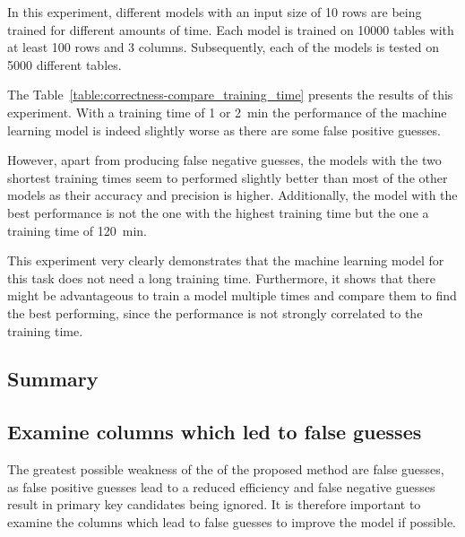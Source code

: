 In this experiment, different models with an input size of \num{10} rows are being trained for different amounts of time. Each model is trained on \num{10000} tables with at least \num{100} rows and \num{3} columns. Subsequently, each of the models is tested on \num{5000} different tables.

The Table~\ref{table:correctness-compare_training_time} presents the results of this experiment. With a training time of \num{1} or \SI{2}{\minute} the performance of the machine learning model is indeed slightly worse as there are some false positive guesses. %

However, apart from producing false negative guesses, the models with the two shortest training times seem to performed slightly better than most of the other models as their accuracy and precision is higher. Additionally, the model with the best performance is not the one with the highest training time but the one a training time of \SI{120}{\minute}. %

This experiment very clearly demonstrates that the machine learning model for this task does not need a long training time. Furthermore, it shows that there might be advantageous to train a model multiple times and compare them to find the best performing, since the performance is not strongly correlated to the training time.






\subsection{Summary}\label{subsec:correctness_conclusions} %


\subsection{Examine columns which led to false guesses}\label{subsec:correctness_examine-false-guesses} %
The greatest possible weakness of the of the proposed method are false guesses, as false positive guesses lead to a reduced efficiency and false negative guesses result in primary key candidates being ignored. It is therefore important to examine the columns which lead to false guesses to improve the model if possible.


